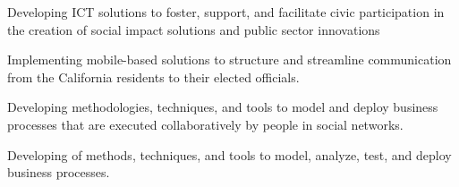 \documentclass[10pt,a4paper]{altacv}
\begin{document}


Developing ICT solutions to foster, support, and facilitate civic participation in the creation of social impact solutions and public sector innovations

\divider

Implementing mobile-based solutions to structure and streamline communication from the California residents to their elected officials.


\divider

Developing methodologies, techniques, and tools to model and deploy business processes that are executed collaboratively by people in social networks.

\divider

Developing of methods, techniques, and tools to model, analyze, test, and deploy business processes.



\end{document}
